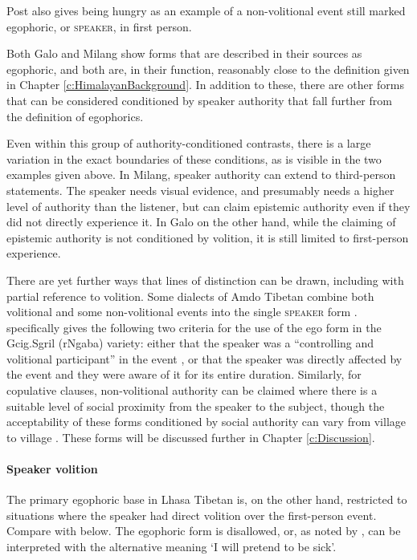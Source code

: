 Post also gives being hungry as an example of a non-volitional event still marked egophoric, or \textsc{speaker}, in first person.

Both Galo and Milang show forms that are described in their sources as egophoric, and both are, in their function, reasonably close to the definition given in Chapter \ref{c:HimalayanBackground}. In addition to these, there are other forms that can be considered conditioned by speaker authority that fall further from the definition of egophorics.


Even within this group of authority-conditioned contrasts, there is a large variation in the exact boundaries of these conditions, as is visible in the two examples given above. In Milang, speaker authority can extend to third-person statements. The speaker needs visual evidence, and presumably needs a higher level of authority than the listener, but can claim epistemic authority even if they did not directly experience it. In Galo on the other hand, while the claiming of epistemic authority is not conditioned by volition, it is still limited to first-person experience.

There are yet further ways that lines of distinction can be drawn, including with partial reference to volition. Some dialects of Amdo Tibetan combine both volitional and some non-volitional events into the single \textsc{speaker} form \cite{Tribur2019}.  specifically gives the following two criteria for the use of the ego form in the Gcig.Sgril (rNgaba) variety: either that the speaker was a ``controlling and volitional participant'' in the event \cite[383]{Tribur2019}, or that the speaker was directly affected by the event and they were aware of it for its entire duration. Similarly, for copulative clauses, non-volitional authority can be claimed where there is a suitable level of social proximity from the speaker to the subject, though the acceptability of these forms conditioned by social authority can vary from village to village \cite[213]{Tribur2019}. These forms will be discussed further in Chapter \ref{c:Discussion}.

\paragraph{Speaker volition}
The primary egophoric base in Lhasa Tibetan is, on the other hand, restricted to situations where the speaker had direct volition over the first-person event. Compare  with  below. The egophoric form is disallowed, or, as noted by , can be interpreted with the alternative meaning `I will pretend to be sick'.

